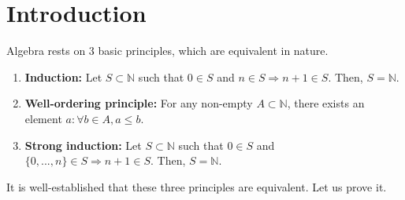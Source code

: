 \chapter{Introduction}
  Algebra rests on 3 basic principles, which are equivalent in nature. 
  \begin{enumerate}
    \item \textbf{Induction:} Let $S \subset \mathbb{N}$ such that $0 \in S$ and $n \in S \Rightarrow n + 1 \in S$. Then, $S = \mathbb{N}$. 
    \item \textbf{Well-ordering principle:} For any non-empty $A \subset \mathbb{N}$, there exists an element $a: \forall b \in A, a \leqslant b$. 
    \item \textbf{Strong induction:} Let $S \subset \mathbb{N}$ such that $0 \in S$ and $\{0, ..., n\} \in S \Rightarrow n + 1 \in S$. Then, $S = \mathbb{N}$. 
  \end{enumerate}

  It is well-established that these three principles are equivalent. Let us prove it. 

